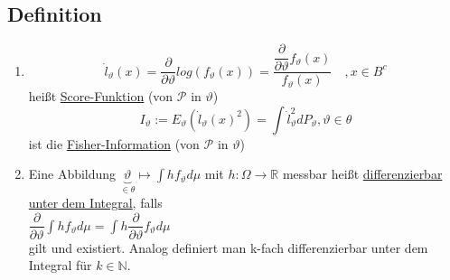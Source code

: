 \documentclass[german,10pt,oneside, fleqn, a4paper]{article}
\newcommand {\R}	{\mathbb{R}}
\newcommand {\N}	{\mathbb{N}}
\newcommand{\ra}{\rightarrow}
\newcommand{\mc}[1]{\mathcal{#1}}
\newcommand{\1}[1]{1_{#1}}
\newcommand{\2}[1]{\1{\brac{#1}}}
\newcommand{\p}{\mc{P}}
\begin{document}
\subsection{Definition}
\label{13.2}
\begin{enumerate}[label=(\alph*)]
\item \[\dot l_\vartheta(x)=\dfrac{\partial}{\partial\vartheta}log(f_\vartheta(x))=\dfrac{\dfrac{\partial}{\partial\vartheta}f_\vartheta(x)}{f_\vartheta(x)}\quad ,x\in B^c\]
heißt \underline{Score-Funktion} (von $\p$ in $\vartheta$)\[I_\vartheta:=E_\vartheta(\dot l_\vartheta(x)^2)=\int\dot l_\vartheta^2dP_\vartheta, \vartheta\in\theta\]
ist die \underline{Fisher-Information} (von $\p$ in $\vartheta$)
\item Eine Abbildung $\underbrace{\vartheta}_{\in\theta}\mapsto\int hf_\vartheta d\mu$ mit $h:\Omega\ra\R$ messbar heißt \underline{differenzierbar unter dem Integral}, falls \\
$\dfrac{\partial}{\partial\vartheta}\int hf_\vartheta d\mu=\int h\dfrac{\partial}{\partial\vartheta}f_\vartheta d\mu$\\
gilt und existiert.
Analog definiert man k-fach differenzierbar unter dem Integral für $k\in\N$.
\end{enumerate}
\end{document}
